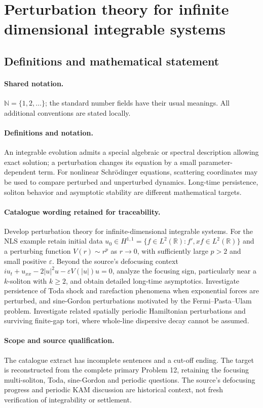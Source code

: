 \documentclass[11pt]{article}
\begin{document}
\section{Perturbation theory for infinite dimensional integrable systems}\label{statement}

\subsection{Definitions and mathematical statement}

\paragraph{Shared notation.}$\mathbb N=\{1,2,\ldots\}$; the standard number fields have their usual meanings. All additional conventions are stated locally.


\paragraph{Definitions and notation.}An integrable evolution admits a special algebraic or spectral description allowing exact solution; a perturbation changes its equation by a small parameter-dependent term. For nonlinear Schrödinger equations, scattering coordinates may be used to compare perturbed and unperturbed dynamics. Long-time persistence, soliton behavior and asymptotic stability are different mathematical targets.

\paragraph{Catalogue wording retained for traceability.}
Develop perturbation theory for infinite-dimensional integrable systems. For the NLS example retain initial data $u_0\in H^{1,1}=\{f\in L^2(\mathbb R):f',xf\in L^2(\mathbb R)\}$ and a perturbing function $V(r)\sim r^p$ as $r\to0$, with sufficiently large $p>2$ and small positive $\varepsilon$. Beyond the source's defocusing context $iu_t+u_{xx}-2|u|^2u-\varepsilon V(|u|)u=0$, analyze the focusing sign, particularly near a $k$-soliton with $k\ge2$, and obtain detailed long-time asymptotics. Investigate persistence of Toda shock and rarefaction phenomena when exponential forces are perturbed, and sine-Gordon perturbations motivated by the Fermi--Pasta--Ulam problem. Investigate related spatially periodic Hamiltonian perturbations and surviving finite-gap tori, where whole-line dispersive decay cannot be assumed.
\paragraph{Scope and source qualification.}The catalogue extract has incomplete sentences and a cut-off ending. The target is reconstructed from the complete primary Problem 12, retaining the focusing multi-soliton, Toda, sine-Gordon and periodic questions. The source’s defocusing progress and periodic KAM discussion are historical context, not fresh verification of integrability or settlement.
\end{document}
